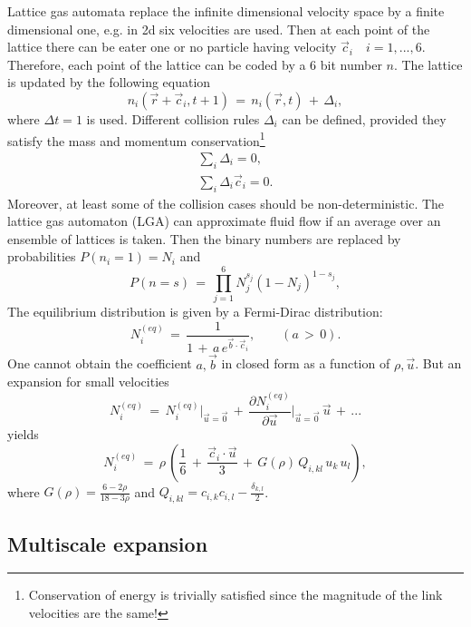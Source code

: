 Lattice gas automata replace the infinite dimensional velocity space by a finite dimensional one, e.g. in 2d six velocities are used. Then at each point of the lattice there can be eater one or no particle having velocity $\vec c_i\quad i=1,...,6$. Therefore, each point of the lattice can be coded by a 6 bit number $n$. The lattice is updated by the following equation
\begin{equation}
 n_i(\vec r + \vec c_i, t+1) \,=\,  n_i(\vec r ,t) \, + \, \Delta_i,\label{LGA}
\end{equation}
where $\Delta t=1$ is used. Different collision rules $\Delta_i$ can be defined, provided they satisfy the mass and momentum conservation\footnote{Conservation of energy is trivially satisfied since the magnitude of the link velocities are the same!}
\begin{eqnarray}
  \sum_i \Delta_i =0, \label{CR} \\
  \sum_i \Delta_i \vec c_i =0.\nonumber
\end{eqnarray}
Moreover, at least some of the collision cases should be non-deterministic. The lattice gas automaton (LGA) can approximate fluid flow if an average over an ensemble of lattices is taken. Then the binary numbers are replaced by probabilities $P(n_i=1)=N_i$ and
\begin{equation}
 P(n=s) \,=\,  \prod_{j=1}^6 N_j^{s_j}(1-N_j)^{1-s_j},\label{fac}
\end{equation}
The equilibrium distribution is given by a Fermi-Dirac distribution:
\begin{equation}
 N_i^{(eq)} \,=\, \frac{1}{1\,+\, a \, e^{\vec b \cdot \vec c_i}},\quad \quad (a \, > \, 0).\nonumber
\end{equation}
One cannot obtain the coefficient $a, \vec b$ in closed form as a function of $\rho, \vec u$. But an expansion for small velocities
\begin{equation}
 N_i^{(eq)} \,=\, N_i^{(eq)}\bigg |_{\vec u =\vec 0}\,+\,\frac{\partial{N_i^{(eq)}}}{\partial{\vec u}} \bigg |_{\vec u =\vec 0} \, \vec u \,+\, ...\nonumber
\end{equation}
yields
\begin{equation}
 N_i^{(eq)} \,=\, \rho \, \left(\frac{1}{6} \,+\, \frac{\vec c_i \cdot \vec u}{3} \,+\, G(\rho) \, Q_{i,kl} \, u_k \, u_l \right) ,\label{LGAEQ}
\end{equation}
where $G(\rho)=\frac{6- 2 \rho}{18-3 \rho}$ and $Q_{i,kl} = c_{i,k} c_{i,l} - \frac{\delta_{k,l}}{2}$.

\subsection{Multiscale expansion}

